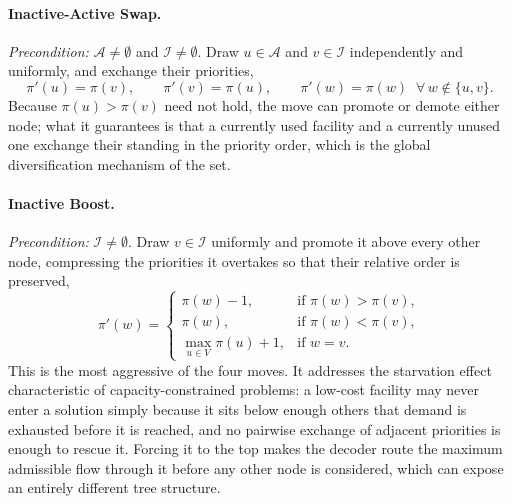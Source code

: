 \documentclass[preprint,12pt,authoryear]{elsarticle}
\begin{document}
\paragraph{Inactive-Active Swap.} \textit{Precondition:} $\mathcal{A} \neq \emptyset$ and $\mathcal{I} \neq \emptyset$. Draw $u \in \mathcal{A}$ and $v \in \mathcal{I}$ independently
and uniformly, and exchange their priorities,
%
\begin{equation}
\label{eq:op_iaswap}
\pi'(u) = \pi(v), \qquad \pi'(v) = \pi(u), \qquad \pi'(w) = \pi(w) \;\; \forall\, w \notin \{u, v\} .
\end{equation}
%
Because $\pi(u) > \pi(v)$ need not hold, the move can promote or demote either node; what it guarantees is that a currently used facility and a currently unused one exchange their
standing in the priority order, which is the global diversification mechanism of the set.

\paragraph{Inactive Boost.} \textit{Precondition:} $\mathcal{I} \neq \emptyset$. Draw $v \in \mathcal{I}$ uniformly and promote it above every other node, compressing the priorities it
overtakes so that their relative order is preserved,
%
\begin{equation}
\label{eq:op_boost}
\pi'(w) =
\begin{cases}
\pi(w) - 1, & \text{if } \pi(w) > \pi(v), \\[2pt]
\pi(w), & \text{if } \pi(w) < \pi(v), \\[2pt]
\displaystyle \max_{u \in V} \pi(u) + 1, & \text{if } w = v .
\end{cases}
\end{equation}
%
This is the most aggressive of the four moves. It addresses the starvation effect characteristic of capacity-constrained problems: a low-cost facility may never enter a solution simply
because it sits below enough others that demand is exhausted before it is reached, and no pairwise exchange of adjacent priorities is enough to rescue it. Forcing it to the top makes
the decoder route the maximum admissible flow through it before any other node is considered, which can expose an entirely different tree structure.

\end{document}
